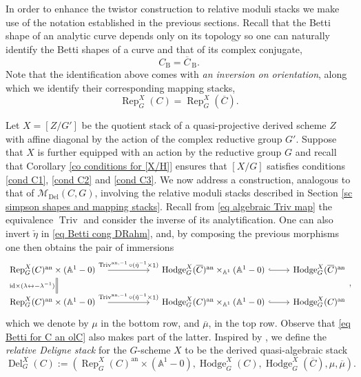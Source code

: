 \documentclass[11pt, a4paper]{amsart}
\numberwithin{equation}{section}
\theoremstyle{definition}
\theoremstyle{remark}
\DeclareMathOperator{\id}{1}
\DeclareMathOperator{\an}{an}
\DeclareMathOperator{\Rep}{Rep}
\DeclareMathOperator{\Hodge}{Hodge}
\DeclareMathOperator{\Deligne}{Del}
\DeclareMathOperator{\Triv}{Triv}
\DeclareMathOperator{\Del}{Del}
\newcommand{\Mm}{\mathcal{M}}
\newcommand{\B}{\mathrm{B}}
\newcommand{\ol}[1]{\overline{#1}}
\renewcommand{\AA}{\mathbb{A}}
\begin{document}
In order to enhance the twistor construction to relative moduli stacks we make use of the notation established in the previous sections. Recall that the Betti shape of an analytic curve depends only on its topology so one can naturally identify the Betti shapes of a curve and that of its complex conjugate,
\[
C_{\B} = \ol{C}_{\, \B}.
\]
Note that the identification above comes with \textit{an inversion on orientation}, along which we identify their corresponding mapping stacks,
\begin{equation} \label{eq Betti for C an olC}
\Rep_{G}^{X}(C) = \Rep_{G}^{X}(\ol{C}).
\end{equation}

Let $X=[Z/G']$ be the quotient stack of a quasi-projective derived scheme $Z$ with affine diagonal by the action of the complex reductive group $G'$. Suppose that $X$ is further equipped with an action by the reductive group $G$ and recall that Corollary \ref{co conditions for [X/H]} ensures that $[X/G]$ satisfies conditions \ref{cond C1}, \ref{cond C2} and \ref{cond C3}. We now address a construction, analogous to that of $\Mm_{\Del}(C,G)$, involving the relative moduli stacks described in Section \ref{sc simpson shapes and mapping stacks}. Recall from \eqref{eq algebraic Triv map} the equivalence $\Triv$ and consider the inverse of its analytification. One can also invert $\check{\eta}$ in \eqref{eq Betti cong DRahm}, and, by composing the previous morphisms one then obtains the pair of immersions
\begin{equation}
\label{eq definition of mu and olmu}
\begin{tikzcd}
\Rep_{G}^{X}(C)^{\an} \times (\AA^1 - 0) \quad
\arrow[rr, "\Triv^{\an, -1} \circ (\check{\eta}^{-1} \times \id )"]
& &
\quad \Hodge_{G}^{X}(\ol{C})^{\an} \times_{\AA^1} (\AA^1 - 0)
\arrow[r, hook]
&
\Hodge_{G}^{X}(\ol{C})^{\an}
\\
\Rep_{G}^{X}(C)^{\an} \times (\AA^1 - 0) \quad
\arrow[rr, "\Triv^{\an, -1} \circ (\check{\eta}^{-1} \times \id )"]
\arrow[u, equal, "\mathrm{id} \times (\lambda \leftrightarrow -\lambda^{-1})"]
& &
\quad \Hodge_{G}^{X}(C)^{\an} \times_{\AA^1} (\AA^1 - 0)
\arrow[r, hook]
&
\Hodge_{G}^{X}(C)^{\an}
\end{tikzcd},
\end{equation}
which we denote by $\mu$ in the bottom row, and $\ol{\mu}$, in the top row. Observe that \eqref{eq Betti for C an olC} also makes part of the latter. Inspired by \cite{franco&hanson}, we define the {\it relative Deligne stack} for the $G$-scheme $X$ to be the derived quasi-algebraic stack
\[
\Deligne_{G}^{X}(C) := \left ( \Rep_{G}^{X}(C)^{\an} \times (\AA^1 - 0), \Hodge_{G}^{X}(C), \Hodge_{G}^{X}(\ol C), \mu, \ol \mu  \right ).
\]
\end{document}
